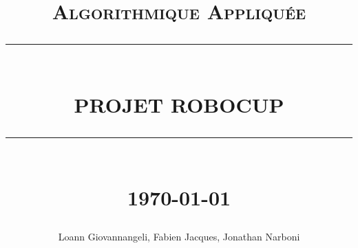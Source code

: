 \documentclass[12pt]{article}
\newcommand{\HRule}[1]{\rule{\linewidth}{#1}}
\begin{document}
\title{ \normalsize \textsc{Algorithmique Appliquée}
		\\ [2.0cm]
		\HRule{0.5pt} \\
		\LARGE \textbf{\uppercase{Projet RoboCup}}
		\HRule{2pt} \\ [0.5cm]
		\normalsize \today \vspace*{5\baselineskip}}

\date{}

\author{
		Loann Giovannangeli, Fabien Jacques, Jonathan Narboni}

\maketitle
\renewcommand{\contentsname}{Sommaire}
\newpage
\tableofcontents
\newpage

\sectionfont{\scshape}








\nocite{FG10}

\end{document}
